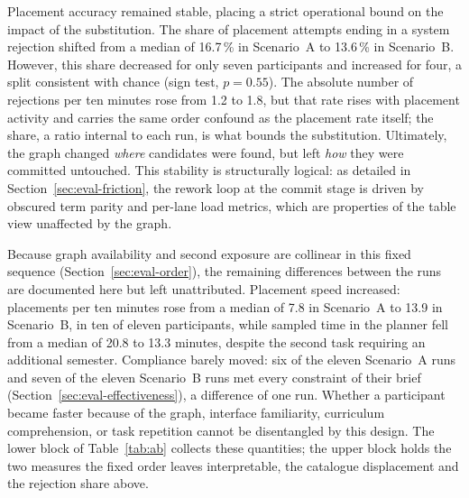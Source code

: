 Placement accuracy remained stable, placing a strict operational bound on the impact of the substitution. The share of placement attempts ending in a system rejection shifted from a median of 16.7\,\% in Scenario~A to 13.6\,\% in Scenario~B. However, this share decreased for only seven participants and increased for four, a split consistent with chance (sign test, $p = 0.55$). The absolute number of rejections per ten minutes rose from 1.2 to 1.8, but that rate rises with placement activity and carries the same order confound as the placement rate itself; the share, a ratio internal to each run, is what bounds the substitution. Ultimately, the graph changed \emph{where} candidates were found, but left \emph{how} they were committed untouched. This stability is structurally logical: as detailed in Section~\ref{sec:eval-friction}, the rework loop at the commit stage is driven by obscured term parity and per-lane load metrics, which are properties of the table view unaffected by the graph.

\label{sec:eval-rate}
Because graph availability and second exposure are collinear in this fixed sequence (Section~\ref{sec:eval-order}), the remaining differences between the runs are documented here but left unattributed. Placement speed increased: placements per ten minutes rose from a median of 7.8 in Scenario~A to 13.9 in Scenario~B, in ten of eleven participants, while sampled time in the planner fell from a median of 20.8 to 13.3 minutes, despite the second task requiring an additional semester. Compliance barely moved: six of the eleven Scenario~A runs and seven of the eleven Scenario~B runs met every constraint of their brief (Section~\ref{sec:eval-effectiveness}), a difference of one run. Whether a participant became faster because of the graph, interface familiarity, curriculum comprehension, or task repetition cannot be disentangled by this design. The lower block of Table~\ref{tab:ab} collects these quantities; the upper block holds the two measures the fixed order leaves interpretable, the catalogue displacement and the rejection share above.

